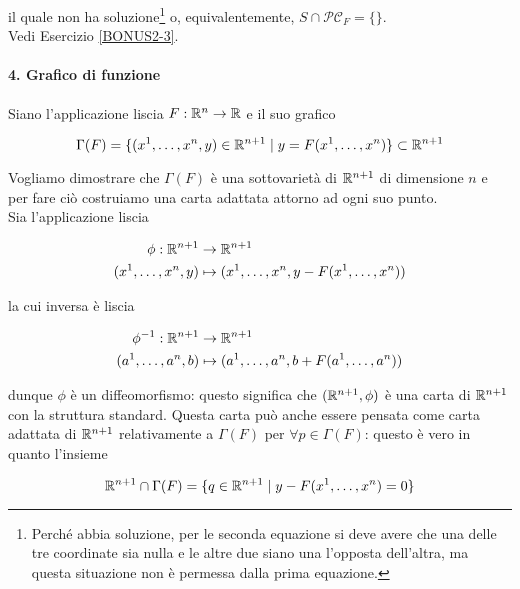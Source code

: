 il quale non ha soluzione\footnote{%
	Perché abbia soluzione, per le seconda equazione si deve avere che una delle tre coordinate sia nulla e le altre due siano una l'opposta dell'altra, ma questa situazione non è permessa dalla prima equazione.%
} o, equivalentemente, $ S \cap \mathcal{PC}_{F} = \{\} $.\\
Vedi Esercizio \ref{BONUS2-3}.

\paragraph{4. Grafico di funzione}

Siano l'applicazione liscia $ F : \mathbb{R}^{n} \to \mathbb{R} $ e il suo grafico

\begin{equation}
	\Gamma(F) = \{ (x^{1},\dots,x^{n},y) \in \mathbb{R}^{n+1} \mid y = F(x^{1},\dots,x^{n}) \} \subset \mathbb{R}^{n+1}
\end{equation}

Vogliamo dimostrare che $ \Gamma(F) $ è una sottovarietà di $ \mathbb{R}^{n+1} $ di dimensione $ n $ e per fare ciò costruiamo una carta adattata attorno ad ogni suo punto.\\
Sia l'applicazione liscia

\begin{align}
	\begin{split}
		\phi : \mathbb{R}^{n+1} &\to \mathbb{R}^{n+1}\\
		(x^{1},\dots,x^{n},y) &\mapsto (x^{1},\dots,x^{n},y - F(x^{1},\dots,x^{n}))
	\end{split}
\end{align}

la cui inversa è liscia

\begin{align}
	\begin{split}
		\phi^{-1} : \mathbb{R}^{n+1} &\to \mathbb{R}^{n+1}\\
		(a^{1},\dots,a^{n},b) &\mapsto (a^{1},\dots,a^{n},b + F(a^{1},\dots,a^{n}))
	\end{split}
\end{align}

dunque $ \phi $ è un diffeomorfismo: questo significa che $ (\mathbb{R}^{n+1},\phi) $ è una carta di $ \mathbb{R}^{n+1} $ con la struttura standard. Questa carta può anche essere pensata come carta adattata di $ \mathbb{R}^{n+1} $ relativamente a $ \Gamma(F) $ per $ \forall p \in \Gamma(F) $: questo è vero in quanto l'insieme

\begin{equation}
	\mathbb{R}^{n+1} \cap \Gamma(F) = \{ q \in \mathbb{R}^{n+1} \mid y - F(x^{1},\dots,x^{n}) = 0 \}
\end{equation}

